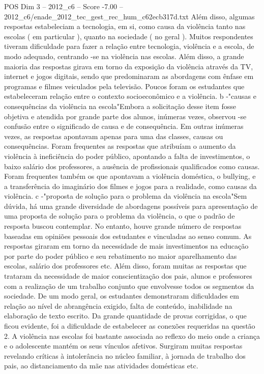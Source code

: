 \begin{textsample}{POS Dim 3 – 2012\_c6 – Score -7.00 – 2012\_c6/enade\_2012\_tec\_gest\_rec\_hum\_c62ecb317d.txt}
Além disso, algumas respostas estabeleciam a tecnologia, em si, como causa da violência tanto nas escolas ( em particular ), quanto na sociedade ( no geral ).
Muitos respondentes tiveram dificuldade para fazer a relação entre tecnologia, violência e a escola, de modo adequado, centrando -se na violência nas escolas.
Além disso, a grande maioria das respostas girava em torno da exposição da violência através da TV, internet e jogos digitais, sendo que predominaram as abordagens com ênfase em programas e filmes veiculados pela televisão.
Poucos foram os estudantes que estabeleceram relação entre o contexto socioeconômico e a violência. b -"causas e consequências da violência na escola"Embora a solicitação desse item fosse objetiva e atendida por grande parte dos alunos, inúmeras vezes, observou -se confusão entre o significado de causa e de consequência.
Em outras inúmeras vezes, as respostas apontavam apenas para uma das classes, causas ou consequências.
Foram frequentes as respostas que atribuíam o aumento da violência à ineficiência do poder público, apontando a falta de investimentos, o baixo salário dos professores, a ausência de profissionais qualificados como causas.
Foram frequentes também os que apontavam a violência doméstica, o bullying, e a transferência do imaginário dos filmes e jogos para a realidade, como causas da violência. c -"proposta de solução para o problema da violência na escola"Sem dúvida, há uma grande diversidade de abordagens possíveis para apresentação de uma proposta de solução para o problema da violência, o que o padrão de resposta buscou contemplar.
No entanto, houve grande número de respostas baseadas em opiniões pessoais dos estudantes e vinculadas ao senso comum.
As respostas giraram em torno da necessidade de mais investimentos na educação por parte do poder público e seu rebatimento no maior aparelhamento das escolas, salário dos professores etc.
Além disso, foram muitas as respostas que trataram da necessidade de maior conscientização dos pais, alunos e professores com a realização de um trabalho conjunto que envolvesse todos os segmentos da sociedade.
De um modo geral, os estudantes demonstraram dificuldades em relação ao nível de abrangência exigido, falta de conteúdo, inabilidade na elaboração de texto escrito.
Da grande quantidade de provas corrigidas, o que ficou evidente, foi a dificuldade de estabelecer as conexões requeridas na questão 2.
A violência nas escolas foi bastante associada ao reflexo do meio onde a criança e o adolescente mantém os seus vínculos afetivos.
Surgiram muitas respostas revelando críticas à intolerância no núcleo familiar, à jornada de trabalho dos pais, ao distanciamento da mãe nas atividades domésticas etc.

\end{textsample}
